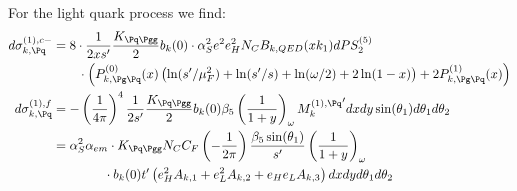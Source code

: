 For the light quark process we find:
\begin{align}
d\sigma_{k,\Pq}^{(1),c-} &= 8\cdot \frac 1 {2xs'} \frac {K_{\Pq\Pgg}} 2 b_k(0) \cdot \alpha_S^2e^2e_H^2 N_C B_{k,QED}(xk_1) dPS_{2}^{(5)} \nonumber\\
 &\hspace{20pt}\cdot \left(P_{k,\Pg\Pq}^{(0)}(x)\left(\ln(s'/\mu_F^2) + \ln(s'/s) + \ln(\omega/2) + 2\ln(1-x)\right) + 2P_{k,\Pg\Pq}^{(1)}(x)\right)\\
d\sigma_{k,\Pq}^{(1),f} &= - \left(\frac 1 {4\pi}\right)^4 \frac 1 {2s'} \frac {K_{\Pq\Pgg}} 2 b_k(0) \beta_5 \left(\frac 1 {1+y}\right)_\omega {M_k^{(1),\Pq}}' dxdy\sin(\theta_1)d\theta_1d\theta_2\\
 &= \alpha_S^2\alpha_{em} \cdot K_{\Pq\Pgg} N_C C_F \left(-\frac{1}{2\pi}\right) \frac{\beta_5\sin(\theta_1)}{s'}  \left(\frac 1 {1+y}\right)_\omega \nonumber\\
 &\hspace{40pt} \cdot b_k(0)t'\left(e_H^2A_{k,1} + e_L^2 A_{k,2} + e_He_L A_{k,3}\right) dxdyd\theta_1d\theta_2
\end{align}

